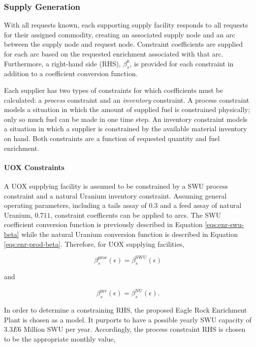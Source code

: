 \subsubsection{Supply Generation}

With all requests known, each supporting supply facility responds to all
requests for their assigned commodity, creating an associated supply node and an
arc between the supply node and request node. Constraint coefficients are
supplied for each arc based on the requested enrichment associated with that
arc. Furthermore, a right-hand side (RHS), $\beta^k_s$, is provided for each
constraint in addition to a coefficient conversion function.

Each supplier has two types of constraints for which coefficients must be
calculated: a \textit{process} constraint and an \textit{inventory} constraint. A
process constraint models a situation in which the amount of supplied fuel is
constrained physically; only so much fuel can be made in one time step. An
inventory constraint models a situation in which a supplier is constrained by
the available material inventory on hand. Both constraints are a function of
requested quantity and fuel enrichment.

\paragraph{UOX Constraints}

A UOX supplying facility is assumed to be constrained by a SWU process
constraint and a natural Uranium inventory constraint. Assuming general
operating parameters, including a tails assay of $0.3$ and a feed assay of
natural Uranium, $0.711$, constraint coefficents can be applied to arcs. The SWU
coefficient conversion function is previously described in Equation
\ref{eqs:enr-swu-beta} while the natural Uranium conversion function is
described in Equation \ref{eqs:enr-prod-beta}. Therefore, for UOX supplying
facilities,

\begin{equation}
\beta^{\text{proc}}_s(\epsilon) = \beta^{\text{SWU}}_s(\epsilon) 
\end{equation}

and

\begin{equation}
\beta^{\text{inv}}_s(\epsilon) = \beta^{\text{NU}}_s(\epsilon). 
\end{equation}

In order to determine a constraining RHS, the proposed Eagle Rock Enrichment
Plant is chosen as a model. It purports to have a possible yearly SWU capacity
of $3.3E6$ Million SWU per year. Accordingly, the process constraint RHS is
chosen to be the appropriate monthly value,

